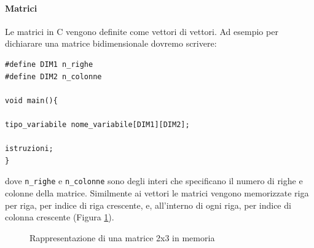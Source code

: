 \documentclass[oneside]{scrbook}
\begin{document}
\paragraph{Matrici}
Le matrici in C vengono definite come vettori di vettori. Ad esempio per dichiarare una matrice bidimensionale dovremo scrivere:
\begin{lstlisting}[style=cstyle]
#define DIM1 n_righe 
#define DIM2 n_colonne

void main(){

tipo_variabile nome_variabile[DIM1][DIM2];

istruzioni;
}
\end{lstlisting}
dove \texttt{n\_righe} e \texttt{n\_colonne} sono degli interi che specificano il numero di righe e colonne della matrice. Similmente ai vettori le matrici vengono memorizzate riga per riga, per indice di riga crescente, e, all'interno di ogni riga, per indice di colonna crescente (Figura \ref{fig:matrice}).

\begin{figure}[h!]
    \centering
    \caption{Rappresentazione di una matrice 2x3 in memoria}
    \label{fig:matrice}
\end{figure}
\end{document}
